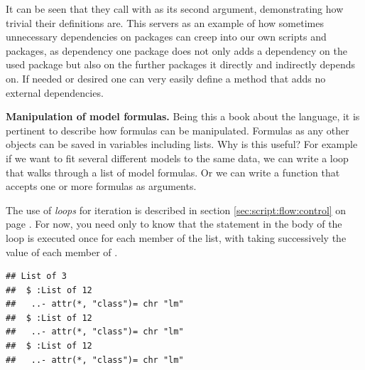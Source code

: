 \documentclass[krantz2]{krantz}\usepackage{knitr}%
\begin{document}
\begin{warningbox}
It can be seen that they call  with  as its second argument, demonstrating how trivial their definitions are. This servers as an example of how sometimes unnecessary dependencies on packages can creep into our own scripts and packages, as dependency one package does not only adds a dependency on the used package but also on the further packages it directly and indirectly depends on. If needed or desired one can very easily define a  method that adds no external dependencies.
\end{warningbox}

\begin{explainbox}
\textbf{Manipulation of model formulas.} Being this a book about the \Rlang language, it is pertinent to describe how formulas can be manipulated. Formulas as any other \Rlang objects can be saved in variables including lists. Why is this useful? For example if we want to fit several different models to the same data, we can write a  loop that walks through a list of model formulas. Or we can write a function that accepts one or more formulas as arguments.

The use of  \emph{loops} for iteration is described in section \ref{sec:script:flow:control} on page \pageref{sec:script:flow:control}. For now, you need only to know that the statement in the body of the loop is executed once for each member of the  list, with  taking successively the value of each member of .
\begin{knitrout}\footnotesize
{}\color{fgcolor}\begin{kframe}
\begin{alltt}
 \hlkwb{<-} \hlstd{(} \hlstd{=} \hlopt{:}\hlstd{,}  \hlstd{= (}\hlopt{:}\hlstd{)} \hlopt{/}  \hlopt{+} \hlstd{(}\hlstd{))}
 \hlkwb{<-} \hlstd{()}
 \hlkwb{<-} \hlstd{(}  \hlopt{~}  \hlopt{-} \hlstd{,}   \hlopt{~}    \hlopt{~}  \hlopt{+} \hlopt{^}\hlstd{)}
   
  \hlkwb{<-}  \hlstd{(}  
 \hlstd{\}}
  \hlstd{=} \hlstd{)}
\end{alltt}
\begin{verbatim}
## List of 3
##  $ :List of 12
##   ..- attr(*, "class")= chr "lm"
##  $ :List of 12
##   ..- attr(*, "class")= chr "lm"
##  $ :List of 12
##   ..- attr(*, "class")= chr "lm"
\end{verbatim}
\end{kframe}
\end{knitrout}


\end{explainbox}
\end{document}
